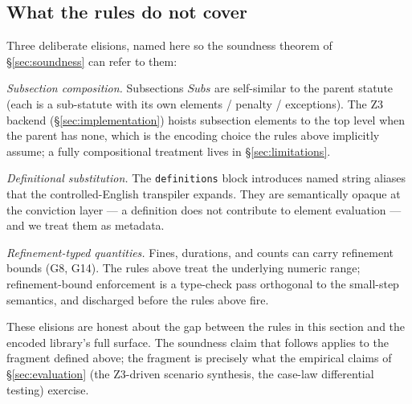 \subsection{What the rules do not cover}
\label{subsec:semantics-scope}

Three deliberate elisions, named here so the soundness theorem of
\S\ref{sec:soundness} can refer to them:

\textit{Subsection composition.} Subsections $\mathit{Subs}$ are
self-similar to the parent statute (each is a sub-statute with
its own elements / penalty / exceptions). The Z3 backend
(\S\ref{sec:implementation}) hoists subsection elements to the
top level when the parent has none, which is the encoding
choice the rules above implicitly assume; a fully compositional
treatment lives in \S\ref{sec:limitations}.

\textit{Definitional substitution.} The \texttt{definitions}
block introduces named string aliases that the
controlled-English transpiler expands. They are semantically
opaque at the conviction layer --- a definition does not
contribute to element evaluation --- and we treat them as
metadata.

\textit{Refinement-typed quantities.} Fines, durations, and
counts can carry refinement bounds (G8, G14). The rules above
treat the underlying numeric range; refinement-bound enforcement
is a type-check pass orthogonal to the small-step semantics, and
discharged before the rules above fire.

These elisions are honest about the gap between the rules in
this section and the encoded library's full surface. The
soundness claim that follows applies to the fragment defined
above; the fragment is precisely what the empirical claims of
\S\ref{sec:evaluation} (the Z3-driven scenario synthesis, the
case-law differential testing) exercise.

